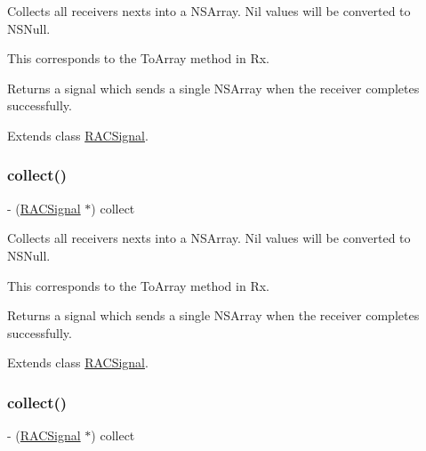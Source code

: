 Collects all receiver\textquotesingle{}s {\ttfamily next}s into a N\+S\+Array. Nil values will be converted to N\+S\+Null.

This corresponds to the {\ttfamily To\+Array} method in Rx.

Returns a signal which sends a single N\+S\+Array when the receiver completes successfully. 

Extends class \mbox{\hyperlink{interface_r_a_c_signal_a70b8f976dc0ece9b82e47cdb346a3a09}{R\+A\+C\+Signal}}.

\mbox{\label{category_r_a_c_signal_07_operations_08_a70b8f976dc0ece9b82e47cdb346a3a09}} 
\subsubsection{\texorpdfstring{collect()}{collect()}\hspace{0.1cm}{\footnotesize\ttfamily [2/3]}}
{\footnotesize\ttfamily -\/ (\mbox{\hyperlink{interface_r_a_c_signal}{R\+A\+C\+Signal}} $\ast$) collect \begin{DoxyParamCaption}{ }\end{DoxyParamCaption}}

Collects all receiver\textquotesingle{}s {\ttfamily next}s into a N\+S\+Array. Nil values will be converted to N\+S\+Null.

This corresponds to the {\ttfamily To\+Array} method in Rx.

Returns a signal which sends a single N\+S\+Array when the receiver completes successfully. 

Extends class \mbox{\hyperlink{interface_r_a_c_signal_a70b8f976dc0ece9b82e47cdb346a3a09}{R\+A\+C\+Signal}}.

\mbox{\label{category_r_a_c_signal_07_operations_08_a70b8f976dc0ece9b82e47cdb346a3a09}} 
\subsubsection{\texorpdfstring{collect()}{collect()}\hspace{0.1cm}{\footnotesize\ttfamily [3/3]}}
{\footnotesize\ttfamily -\/ (\mbox{\hyperlink{interface_r_a_c_signal}{R\+A\+C\+Signal}} $\ast$) collect \begin{DoxyParamCaption}{ }\end{DoxyParamCaption}}

